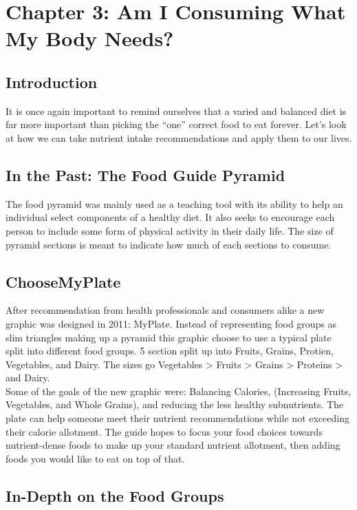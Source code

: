 \documentclass[letterpaper, 11pt]{article}
\begin{document}
\section{Chapter 3: Am I Consuming What My Body Needs?}
\label{sec:orgf7c41d2}
\subsection{Introduction}
\label{sec:orgde253f6}
It is once again important to remind ourselves that a varied and balanced diet is far more important than picking the ``one'' correct food to eat forever. Let's look at how we can take nutrient intake recommendations and apply them to our lives.\\
\subsection{In the Past: The Food Guide Pyramid}
\label{sec:orgddfc551}
The food pyramid was mainly used as a teaching tool with its ability to help an individual select components of a healthy diet. It also seeks to encourage each person to include some form of physical activity in their daily life. The size of pyramid sections is meant to indicate how much of each sections to consume.\\
\subsection{ChooseMyPlate}
\label{sec:org13bc821}
After recommendation from health professionals and consumers alike a new graphic was designed in 2011: MyPlate. Instead of representing food groups as slim triangles making up a pyramid this graphic choose to use a typical plate split into different food groups. 5 section split up into Fruits, Grains, Protien, Vegetables, and Dairy. The sizes go Vegetables > Fruits > Grains >  Proteins > and Dairy.\\
Some of the goals of the new graphic were: Balancing Calories, (Increasing Fruits, Vegetables, and Whole Grains), and reducing the less healthy subnutrients. The plate can help someone meet their nutrient recommendations while not exceeding their calorie allotment. The guide hopes to focus your food choices towards nutrient-dense foods to make up your standard nutrient allotment, then adding foods you would like to eat on top of that.\\
\subsection{In-Depth on the Food Groups}
\label{sec:org2d7e9aa}
\end{document}
